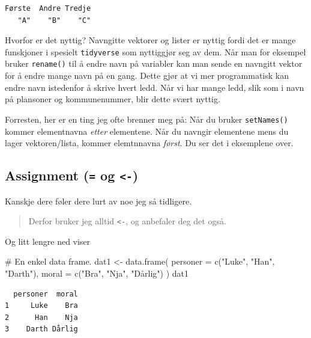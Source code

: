 \documentclass[
  letterpaper,
  DIV=11,
  numbers=noendperiod]{scrreprt}
\newenvironment{Shaded}{\begin{snugshade}}{\end{snugshade}}
\newcommand{\AttributeTok}[1]{\textcolor[rgb]{0.40,0.45,0.13}{#1}}
\newcommand{\CommentTok}[1]{\textcolor[rgb]{0.37,0.37,0.37}{#1}}
\newcommand{\FunctionTok}[1]{\textcolor[rgb]{0.28,0.35,0.67}{#1}}
\newcommand{\NormalTok}[1]{\textcolor[rgb]{0.00,0.23,0.31}{#1}}
\newcommand{\OtherTok}[1]{\textcolor[rgb]{0.00,0.23,0.31}{#1}}
\newcommand{\StringTok}[1]{\textcolor[rgb]{0.13,0.47,0.30}{#1}}
\begin{document}
\begin{verbatim}
Første  Andre Tredje 
   "A"    "B"    "C" 
\end{verbatim}

Hvorfor er det nyttig? Navngitte vektorer og lister er nyttig fordi det
er mange funskjoner i spesielt \texttt{tidyverse} som nyttiggjør seg av
dem. Når man for eksempel bruker \texttt{rename()} til å endre navn på
variabler kan man sende en navngitt vektor for å endre mange navn på en
gang. Dette gjør at vi mer programmatisk kan endre navn istedenfor å
skrive hvert ledd. Når vi har mange ledd, slik som i navn på plansoner
og kommunenummer, blir dette svært nyttig.

Forresten, her er en ting jeg ofte brenner meg på: Når du bruker
\texttt{setNames()} kommer elementnavna \emph{etter} elementene. Når du
navngir elementene mens du lager vektoren/lista, kommer elemtnnavna
\emph{først}. Du ser det i eksemplene over.

\hypertarget{assignment-og--}{%
\subsection{\texorpdfstring{Assignment (\texttt{=} og
\texttt{\textless{}-})}{Assignment (= og \textless-)}}\label{assignment-og--}}

Kanskje dere føler dere lurt av noe jeg så tidligere.

\begin{quote}
Derfor bruker jeg alltid \texttt{\textless{}-}, og anbefaler deg det
også.
\end{quote}

Og litt lengre ned viser

\begin{Shaded}
\begin{Highlighting}[]
\CommentTok{\# En enkel data frame.}
\NormalTok{dat1 }\OtherTok{\textless{}{-}} \FunctionTok{data.frame}\NormalTok{(}
  \AttributeTok{personer =} \FunctionTok{c}\NormalTok{(}\StringTok{"Luke"}\NormalTok{, }\StringTok{"Han"}\NormalTok{, }\StringTok{"Darth"}\NormalTok{),}
  \AttributeTok{moral =} \FunctionTok{c}\NormalTok{(}\StringTok{"Bra"}\NormalTok{, }\StringTok{"Nja"}\NormalTok{, }\StringTok{"Dårlig"}\NormalTok{)}
\NormalTok{)}
\NormalTok{dat1}
\end{Highlighting}
\end{Shaded}

\begin{verbatim}
  personer  moral
1     Luke    Bra
2      Han    Nja
3    Darth Dårlig
\end{verbatim}
\end{document}
